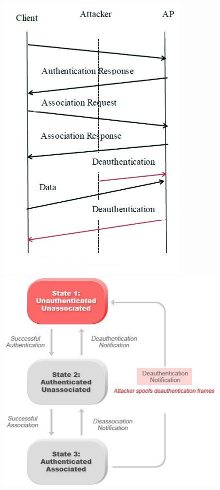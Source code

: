 \documentclass[10pt,a4paper]{article}
\begin{document}
\begin{figure}[ht]
    \hspace{30px}
    \includegraphics[scale=0.4]{images/deauthentication_attack.jpg}
    \hspace{40px}
    \includegraphics[scale=0.9]{images/deauthentication_process.jpg}
\end{figure}
\end{document}
